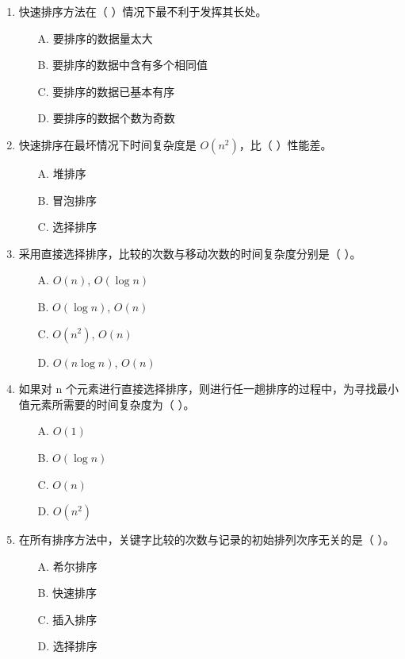 \documentclass[12pt, a4paper]{article}
\begin{document}
\begin{enumerate}
    \item 快速排序方法在（ ）情况下最不利于发挥其长处。
    \begin{enumerate}
        \item[A.] 要排序的数据量太大
        \item[B.] 要排序的数据中含有多个相同值
        \item[C.] 要排序的数据已基本有序
        \item[D.] 要排序的数据个数为奇数
    \end{enumerate}
    
    \item 快速排序在最坏情况下时间复杂度是 $O(n^2)$，比（ ）性能差。
    \begin{enumerate}
        \item[A.] 堆排序
        \item[B.] 冒泡排序
        \item[C.] 选择排序
    \end{enumerate}
    
    \item 采用直接选择排序，比较的次数与移动次数的时间复杂度分别是（ ）。
    \begin{enumerate}
        \item[A.] $O(n)$, $O(\log n)$
        \item[B.] $O(\log n)$, $O(n)$
        \item[C.] $O(n^2)$, $O(n)$
        \item[D.] $O(n \log n)$, $O(n)$
    \end{enumerate}
    
    \item 如果对 n 个元素进行直接选择排序，则进行任一趟排序的过程中，为寻找最小值元素所需要的时间复杂度为（ ）。
    \begin{enumerate}
        \item[A.] $O(1)$
        \item[B.] $O(\log n)$
        \item[C.] $O(n)$
        \item[D.] $O(n^2)$
    \end{enumerate}
    
    \item 在所有排序方法中，关键字比较的次数与记录的初始排列次序无关的是（ ）。
    \begin{enumerate}
        \item[A.] 希尔排序
        \item[B.] 快速排序
        \item[C.] 插入排序
        \item[D.] 选择排序
    \end{enumerate}
    

\end{enumerate}
\end{document}
